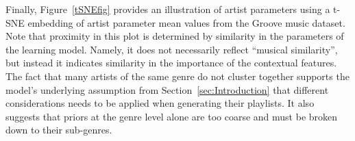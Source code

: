  
Finally, Figure~\ref{tSNEfig} provides an illustration of artist parameters using a t-SNE embedding \cite{Maaten2008} of artist parameter mean values from the Groove music dataset. 
Note that proximity in this plot is determined by similarity in the parameters of the learning model. Namely, it does not necessarily reflect ``musical similarity'', but instead it indicates similarity in the importance of the contextual features. The fact that many artists of the same genre do not cluster together supports the model's underlying assumption from Section~\ref{sec:Introduction} that different considerations needs to be applied when generating their playlists. It also suggests that priors at the genre level alone are too coarse and must be broken down to their sub-genres. 





